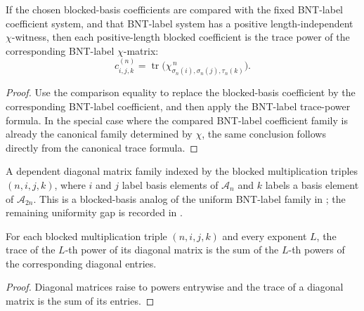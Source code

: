 \begin{theorem}%
    \label{thm:mpdo_bnt_blocked_basis_coefficient_eq_trace_pow}
    \leanok
    If the chosen blocked-basis coefficients are compared with the fixed
    BNT-label coefficient system, and that BNT-label system has a positive
    length-independent $\chi$-witness, then each positive-length blocked
    coefficient is the trace power of the corresponding BNT-label
    $\chi$-matrix:
    \[
        c^{(n)}_{i,j,k}
        = \operatorname{tr}
        \bigl(    \chi_{\sigma_n(i),\sigma_n(j),\tau_n(k)}^{\,n}
        \bigr).
    \]
\end{theorem}
\begin{proof}\leanok
    Use the comparison equality to replace the blocked-basis coefficient by the
    corresponding BNT-label coefficient, and then apply the BNT-label
    trace-power formula.
    In the special case where the compared BNT-label coefficient family is
    already the canonical family determined by $\chi$, the same conclusion
    follows directly from the canonical trace formula.
\end{proof}

\begin{definition}%
    \label{def:mpdo_blocked_structure_chi_family}
    \leanok
    A dependent diagonal matrix family indexed by the blocked multiplication
    triples $(n,i,j,k)$, where $i$ and $j$ label basis elements of
    $\mathcal{A}_n$ and $k$ labels a basis element of $\mathcal{A}_{2n}$.
    This is a blocked-basis analog of the uniform BNT-label family in
    \cite[Theorem~4.14(ii)]{Cirac2016MPDO_arXiv}; the remaining uniformity
    gap is recorded in
    .
\end{definition}

\begin{theorem}%
    \label{thm:mpdo_blocked_structure_chi_trace_matrix_pow}
    \leanok
    For each blocked multiplication triple $(n,i,j,k)$ and every exponent
    $L$, the trace of the $L$-th power of its diagonal matrix is the sum of the
    $L$-th powers of the corresponding diagonal entries.
\end{theorem}
\begin{proof}\leanok
    Diagonal matrices raise to powers entrywise and the trace of a diagonal
    matrix is the sum of its entries.
\end{proof}

